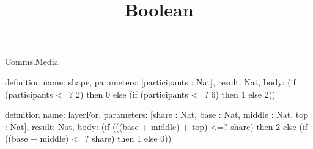 \begin{lexlean}{Comms.Media}
\title{Boolean}
\begin{semanticmodule}
definition{
  name: shape,
  parameters: [participants : Nat],
  result: Nat,
  body: (if (participants <=? 2) then 0 else (if (participants <=? 6) then 1 else 2))
}

definition{
  name: layerFor,
  parameters: [share : Nat, base : Nat, middle : Nat, top : Nat],
  result: Nat,
  body: (if (((base + middle) + top) <=? share) then 2 else (if ((base + middle) <=? share) then 1 else 0))
}
\end{semanticmodule}
\end{lexlean}
